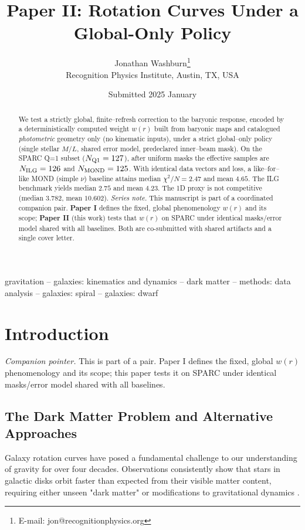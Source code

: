 \documentclass[usenatbib]{mnras}
\title[Rotation Curves Under a Global-Only Policy]{Paper II: Rotation Curves Under a Global-Only Policy}
\author[J. Washburn]{Jonathan Washburn\thanks{E-mail: jon@recognitionphysics.org}\\
Recognition Physics Institute, Austin, TX, USA
}
\date{Submitted 2025 January}
\begin{document}
\maketitle

\begin{abstract}
We test a strictly global, finite–refresh correction to the baryonic response, encoded by a deterministically computed weight $w(r)$ built from baryonic maps and catalogued \emph{photometric} geometry only (no kinematic inputs), under a strict global–only policy (single stellar $M/L$, shared error model, predeclared inner–beam mask). On the SPARC Q=1 subset ($N_{\rm Q1}=127$), after uniform masks the effective samples are $N_{\rm ILG}=126$ and $N_{\rm MOND}=125$. With identical data vectors and loss, a like–for–like MOND (simple $\nu$) baseline attains median $\chi^2/N=\mathbf{2.47}$ and mean $\mathbf{4.65}$. The ILG benchmark yields median $\mathbf{2.75}$ and mean $\mathbf{4.23}$. The 1D proxy is not competitive (median $\mathbf{3.782}$, mean $\mathbf{10.602}$).
\vspace{0.5em}
\noindent\textit{Series note.} This manuscript is part of a coordinated companion pair. \textbf{Paper I} defines the fixed, global phenomenology $w(r)$ and its scope; \textbf{Paper II} (this work) tests that $w(r)$ on SPARC under identical masks/error model shared with all baselines. Both are co-submitted with shared artifacts and a single cover letter.
\end{abstract}

\begin{keywords}
gravitation -- galaxies: kinematics and dynamics -- dark matter -- methods: data analysis -- galaxies: spiral -- galaxies: dwarf
\end{keywords}

\section{Introduction}
\noindent\textit{Companion pointer.} This is part of a pair. Paper I defines the fixed, global $w(r)$ phenomenology and its scope; this paper tests it on SPARC under identical masks/error model shared with all baselines.

\subsection{The Dark Matter Problem and Alternative Approaches}

Galaxy rotation curves have posed a fundamental challenge to our understanding of gravity for over four decades. Observations consistently show that stars in galactic disks orbit faster than expected from their visible matter content, requiring either unseen "dark matter" or modifications to gravitational dynamics \citep{RubinFord1970, Bosma1981}.
\end{document}

